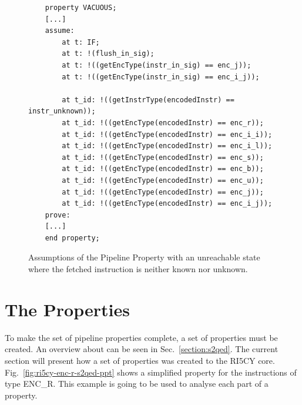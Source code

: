 \begin{figure}[htb!]
    \begin{lstlisting}
    property VACUOUS;
    [...]
    assume:
        at t: IF;
        at t: !(flush_in_sig);
        at t: !((getEncType(instr_in_sig) == enc_j));
        at t: !((getEncType(instr_in_sig) == enc_i_j));
        
        at t_id: !((getInstrType(encodedInstr) == instr_unknown));
        at t_id: !((getEncType(encodedInstr) == enc_r));
        at t_id: !((getEncType(encodedInstr) == enc_i_i));
        at t_id: !((getEncType(encodedInstr) == enc_i_l));
        at t_id: !((getEncType(encodedInstr) == enc_s));
        at t_id: !((getEncType(encodedInstr) == enc_b));
        at t_id: !((getEncType(encodedInstr) == enc_u));
        at t_id: !((getEncType(encodedInstr) == enc_j));
        at t_id: !((getEncType(encodedInstr) == enc_i_j));
    prove:
    [...]
    end property;\end{lstlisting}
    \caption{Assumptions of the Pipeline Property with an unreachable state where the fetched instruction is neither known nor unknown.}
    \label{fig:ri5cy-vacuous-ppt}
\end{figure}

\section{The \SSQED{} Properties}
\label{section:ri5cy-s2qed-ppt}

To make the set of pipeline properties complete, a set of \SSQED{} properties must be created. An overview about \SSQED{} can be seen in Sec.~\ref{section:s2qed}. The current section will present how a set of \SSQED{} properties was created to the RI5CY core.  Fig.~\ref{fig:ri5cy-enc-r-s2qed-ppt} shows a simplified \SSQED{} property for the instructions of type ENC\_R. This example is going to be used to analyse each part of a \SSQED{} property.

